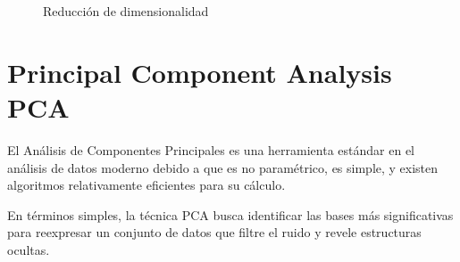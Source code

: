 \documentclass{article}
\begin{document}
\begin{figure}
	\centering

	\caption{Reducción de dimensionalidad}
	\label{fig:reduccion-dimensionalidad}
\end{figure}

\section{Principal Component Analysis PCA} 
\label{sec:principal_component_analysis_pca}
El Análisis de Componentes Principales es una herramienta estándar en el análisis de datos moderno debido a que es no paramétrico, es simple, y existen algoritmos relativamente eficientes para su cálculo.

En términos simples, la técnica PCA busca identificar las bases más significativas para reexpresar un conjunto de datos que filtre el ruido y revele estructuras ocultas.
\end{document}

